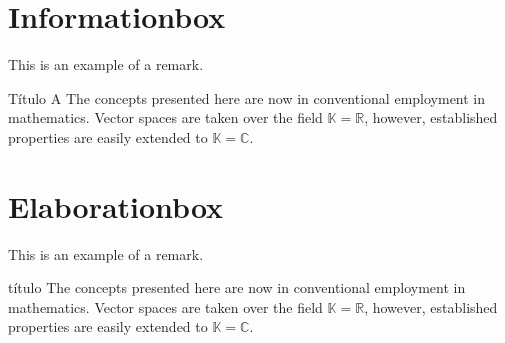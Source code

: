 
\section{Informationbox}

This is an example of a remark.

\begin{informationbox}{Título A}
The concepts presented here are now in conventional employment in mathematics. 
Vector spaces are taken over the field $\mathbb{K}=\mathbb{R}$, however, established properties are easily extended to $\mathbb{K}=\mathbb{C}$.
\end{informationbox}


\section{Elaborationbox}

This is an example of a remark.

\begin{elaborationbox}{título}
The concepts presented here are now in conventional employment in mathematics. 
Vector spaces are taken over the field $\mathbb{K}=\mathbb{R}$, however, established properties are easily extended to $\mathbb{K}=\mathbb{C}$.
\end{elaborationbox}




